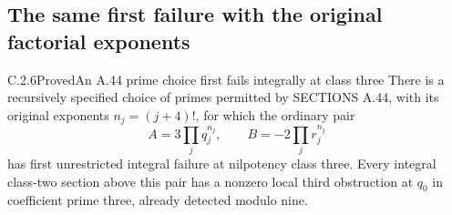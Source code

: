 \subsection{The same first failure with the original factorial exponents}
\label{sec:ghost-class3-original}

\begin{result}{C.2.6}{Proved}{An A.44 prime choice first fails integrally at class three}
\label{thm:ghost-original-first-integral-class3}
There is a recursively specified choice of primes permitted
by SECTIONS A.44, with its original exponents
\(n_j=(j+4)!\), for which the ordinary pair
\[
              A=3\prod_jq_j^{n_j},\qquad
              B=-2\prod_jr_j^{n_j}
\]
has first unrestricted integral failure at nilpotency
class three. Every integral class-two section above
this pair has a nonzero local third obstruction at
\(q_0\) in coefficient prime three, already detected
modulo nine.
\end{result}
